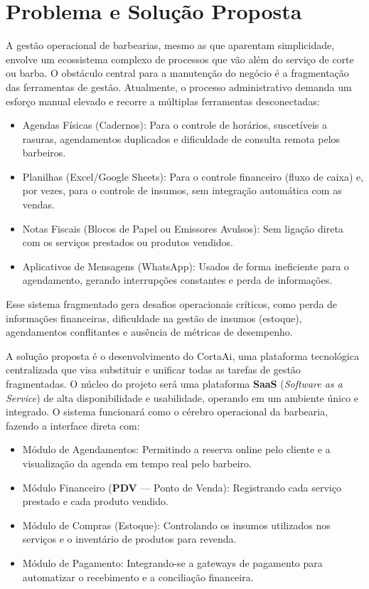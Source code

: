 \documentclass[
    12pt, 
    a4paper, 
    oneside, 
    chapter=TITLE, 
    section=TITLE
]{abntex2}
\begin{document}
\section{Problema e Solução Proposta}
A gestão operacional de barbearias, mesmo as que aparentam simplicidade, envolve um ecossistema complexo de processos que vão além do serviço de corte ou barba. O obstáculo central para a manutenção do negócio é a fragmentação das ferramentas de gestão. Atualmente, o processo administrativo demanda um esforço manual elevado e recorre a múltiplas ferramentas desconectadas:
\begin{itemize}
    \item Agendas Físicas (Cadernos): Para o controle de horários, suscetíveis a rasuras, agendamentos duplicados e dificuldade de consulta remota pelos barbeiros.
    \item Planilhas (Excel/Google Sheets): Para o controle financeiro (fluxo de caixa) e, por vezes, para o controle de insumos, sem integração automática com as vendas.
    \item Notas Fiscais (Blocos de Papel ou Emissores Avulsos): Sem ligação direta com os serviços prestados ou produtos vendidos.
    \item Aplicativos de Mensagens (WhatsApp): Usados de forma ineficiente para o agendamento, gerando interrupções constantes e perda de informações.
\end{itemize}
Esse sistema fragmentado gera desafios operacionais críticos, como perda de informações financeiras, dificuldade na gestão de insumos (estoque), agendamentos conflitantes e ausência de métricas de desempenho.

A solução proposta é o desenvolvimento do CortaAi, uma plataforma tecnológica centralizada que visa substituir e unificar todas as tarefas de gestão fragmentadas. O núcleo do projeto será uma plataforma \textbf{SaaS} (\textit{Software as a Service}) de alta disponibilidade e usabilidade, operando em um ambiente único e integrado. O sistema funcionará como o cérebro operacional da barbearia, fazendo a interface direta com:
\begin{itemize}
    \item Módulo de Agendamentos: Permitindo a reserva online pelo cliente e a visualização da agenda em tempo real pelo barbeiro.
    \item Módulo Financeiro (\textbf{PDV} — Ponto de Venda): Registrando cada serviço prestado e cada produto vendido.
    \item Módulo de Compras (Estoque): Controlando os insumos utilizados nos serviços e o inventário de produtos para revenda.
    \item Módulo de Pagamento: Integrando-se a gateways de pagamento para automatizar o recebimento e a conciliação financeira.
\end{itemize}
\end{document}
